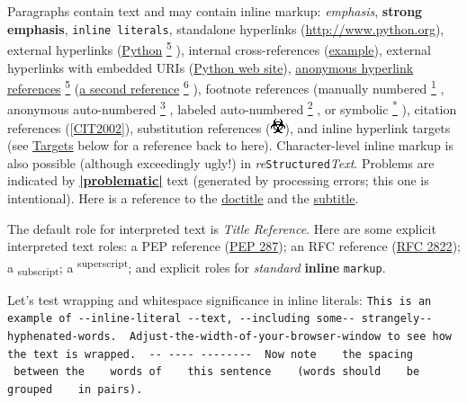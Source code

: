 \documentclass[a4paper]{article}
\providecommand*{\DUfootnotemark}[3]{%
  \raisebox{1em}{\hypertarget{#1}{}}%
  \hyperlink{#2}{\textsuperscript{#3}}%
}
\providecommand*{\DUroletitlereference}[1]{\textsl{#1}}
\begin{document}
Paragraphs contain text and may contain inline markup: \emph{emphasis},
\textbf{strong emphasis}, \texttt{inline literals}, standalone hyperlinks
(\url{http://www.python.org}), external hyperlinks (\href{http://www.python.org/}{Python}\DUfootnotemark{id30}{id29}{5}), internal
cross-references (\hyperref[example]{example}), external hyperlinks with embedded URIs
(\href{http://www.python.org}{Python web site}), \href{http://www.python.org/}{anonymous hyperlink
references}\DUfootnotemark{id33}{id29}{5} (\href{http://docutils.sourceforge.net/}{a second reference}\DUfootnotemark{id35}{id34}{6}), footnote references (manually
numbered\DUfootnotemark{id1}{id8}{1}, anonymous auto-numbered\DUfootnotemark{id2}{id12}{3}, labeled auto-numbered\DUfootnotemark{id3}{label}{2}, or symbolic\DUfootnotemark{id4}{id13}{*}), citation references ([\hyperlink{cit2002}{CIT2002}]),
substitution references (\includegraphics{../../../docs/user/rst/images/biohazard.png}), and %
\label{inline-hyperlink-targets}inline hyperlink targets
(see \hyperref[targets]{Targets} below for a reference back to here).  Character-level
inline markup is also possible (although exceedingly ugly!) in \emph{re}\texttt{Structured}\emph{Text}.  Problems are indicated by %
\hyperlink{id27}{\textbf{\color{red}|problematic|}} text
(generated by processing errors; this one is intentional).  Here is a
reference to the \hyperref[doctitle]{doctitle} and the \hyperref[subtitle]{subtitle}.

The default role for interpreted text is \DUroletitlereference{Title Reference}.  Here are
some explicit interpreted text roles: a PEP reference (\href{http://www.python.org/dev/peps/pep-0287}{PEP 287}); an
RFC reference (\href{http://www.faqs.org/rfcs/rfc2822.html}{RFC 2822}); a \textsubscript{subscript}; a \textsuperscript{superscript};
and explicit roles for \emph{standard} \textbf{inline}
\texttt{markup}.


Let's test wrapping and whitespace significance in inline literals:
\texttt{This is an example of -{}-inline-literal -{}-text, -{}-including some-{}-
strangely-{}-hyphenated-words. ~Adjust-the-width-of-your-browser-window
to see how the text is wrapped. ~-{}- -{}-{}-{}- -{}-{}-{}-{}-{}-{}-{}- ~Now note ~ ~the
spacing ~ ~between the ~ ~words of ~ ~this sentence ~ ~(words
should ~ ~be grouped ~ ~in pairs).}
\end{document}
